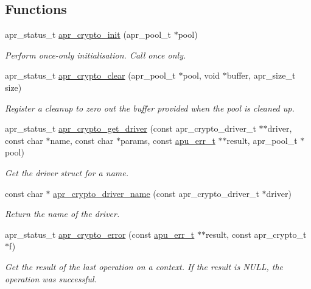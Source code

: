 \subsection*{Functions}
\begin{DoxyCompactItemize}
\item 
apr\-\_\-status\-\_\-t \hyperlink{group___a_p_r___util___crypto_gac67bd5ffd6961c27e3bccad02021edd5}{apr\-\_\-crypto\-\_\-init} (apr\-\_\-pool\-\_\-t $\ast$pool)
\begin{DoxyCompactList}\small\item\em Perform once-\/only initialisation. Call once only. \end{DoxyCompactList}\item 
apr\-\_\-status\-\_\-t \hyperlink{group___a_p_r___util___crypto_ga88794e872ffee43d6fefb4f13072983f}{apr\-\_\-crypto\-\_\-clear} (apr\-\_\-pool\-\_\-t $\ast$pool, void $\ast$buffer, apr\-\_\-size\-\_\-t size)
\begin{DoxyCompactList}\small\item\em Register a cleanup to zero out the buffer provided when the pool is cleaned up. \end{DoxyCompactList}\item 
apr\-\_\-status\-\_\-t \hyperlink{group___a_p_r___util___crypto_ga0a6a35349a7e108ee4964c2d3be5f362}{apr\-\_\-crypto\-\_\-get\-\_\-driver} (const apr\-\_\-crypto\-\_\-driver\-\_\-t $\ast$$\ast$driver, const char $\ast$name, const char $\ast$params, const \hyperlink{structapu__err__t}{apu\-\_\-err\-\_\-t} $\ast$$\ast$result, apr\-\_\-pool\-\_\-t $\ast$pool)
\begin{DoxyCompactList}\small\item\em Get the driver struct for a name. \end{DoxyCompactList}\item 
const char $\ast$ \hyperlink{group___a_p_r___util___crypto_ga4cd6fef8b4b9b2d0914183a664d6e886}{apr\-\_\-crypto\-\_\-driver\-\_\-name} (const apr\-\_\-crypto\-\_\-driver\-\_\-t $\ast$driver)
\begin{DoxyCompactList}\small\item\em Return the name of the driver. \end{DoxyCompactList}\item 
apr\-\_\-status\-\_\-t \hyperlink{group___a_p_r___util___crypto_ga9795c7187a309d1710541f30b0395204}{apr\-\_\-crypto\-\_\-error} (const \hyperlink{structapu__err__t}{apu\-\_\-err\-\_\-t} $\ast$$\ast$result, const apr\-\_\-crypto\-\_\-t $\ast$f)
\begin{DoxyCompactList}\small\item\em Get the result of the last operation on a context. If the result is N\-U\-L\-L, the operation was successful. \end{DoxyCompactList}\item 
$$
\end{DoxyCompactItemize}
